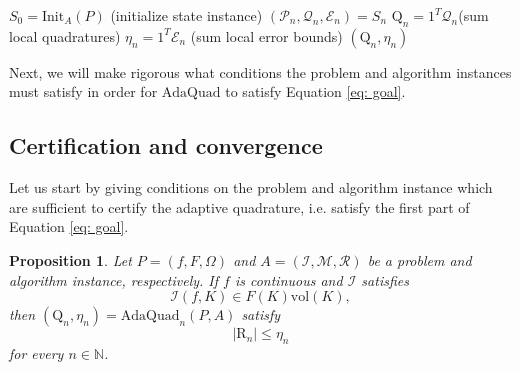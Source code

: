 \documentclass[a4paper, 11pt]{article}
\newtheorem{proposition}[theorem]{Proposition}
\newcommand{\vol}{\mathrm{vol}}
\begin{document}
	\vspace{1em}
	\begin{algorithm}[H]
		\LinesNotNumbered        %
		\DontPrintSemicolon
		\caption{$\mathrm{AdaQuad}_n(P,A)$}
		\label{alg: adaptive integration}
		
		\BlankLine
		$S_0 = \mathrm{Init}_A(P)$ \quad (initialize state instance)\;
		$(\mathcal{P}_n,\mathcal{Q}_n,\mathcal{E}_n) = S_n$\;
		$\mathrm{Q}_n = 1^T \mathcal{Q}_n$\quad (sum local quadratures)\;
		$\eta_n = 1^T \mathcal{E}_n$ \quad (sum local error bounds)\;
		\Return $(\mathrm{Q}_n, \eta_n)$
	\end{algorithm}
	\vspace{1em}
	
	Next, we will make rigorous what conditions the problem and algorithm instances must satisfy in order for $\mathrm{AdaQuad}$ to satisfy Equation \eqref{eq: goal}.
	
	
	
	
	\subsection{Certification and convergence}
	
	Let us start by giving conditions on the problem and algorithm instance which are sufficient to certify the adaptive quadrature, i.e. satisfy the first part of Equation \eqref{eq: goal}.
	
	\begin{proposition}\label{prop: certificate}
		Let $P=(f,F,\Omega)$ and $A=(\mathcal{I}, \mathcal{M}, \mathcal{R})$ be a problem and algorithm instance, respectively. If $f$ is continuous and $\mathcal{I}$ satisfies
		\begin{equation}\label{eq: quadrature}
			\mathcal{I}(f,K) \in F(K)\vol(K),
		\end{equation}
		then $(\mathrm{Q}_n , \eta_n) = \mathrm{AdaQuad}_n(P,A)$ satisfy
		$$ |\mathrm{R}_n|  \leq \eta_n $$
		for every $n\in \mathbb{N}$.
	\end{proposition}
	
\end{document}
